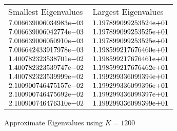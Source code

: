 \begin{enumerate}
\begin{figure} 
 \centering    
\begin{tabular}{ ||p{6cm}||p{6cm}|}
\hline
 Smallest Eigenvalues & Largest Eigenvalues \\ \hhline{|=|=|}   
\hline
${7.006639006034983}\mathrm{e}{-03}$ & ${1.197899099253524}\mathrm{e}{+01}$ \\  
${7.006639006042774}\mathrm{e}{-03}$ & ${1.197899099253525}\mathrm{e}{+01}$ \\  
${7.006639006050910}\mathrm{e}{-03}$ & ${1.197899099253525}\mathrm{e}{+01}$ \\  
${7.006642433917978}\mathrm{e}{-03}$ & ${1.198599217676460}\mathrm{e}{+01}$ \\  
${1.400782323538701}\mathrm{e}{-02}$ & ${1.198599217676461}\mathrm{e}{+01}$ \\  
${1.400782323539747}\mathrm{e}{-02}$ & ${1.198599217676462}\mathrm{e}{+01}$ \\  
${1.400782323539999}\mathrm{e}{-02}$ & ${1.199299336099394}\mathrm{e}{+01}$ \\  
${2.100900746475157}\mathrm{e}{-02}$ & ${1.199299336099396}\mathrm{e}{+01}$ \\  
${2.100900746475692}\mathrm{e}{-02}$ & ${1.199299336099397}\mathrm{e}{+01}$ \\  
${2.100900746476310}\mathrm{e}{-02}$ & ${1.199299336099399}\mathrm{e}{+01}$ \\  
\hline  
\end{tabular} 
\caption{Approximate Eigenvalues using $K = 1200$}
   \label{tab:eig1200}
\end{figure} 


\end{enumerate}
